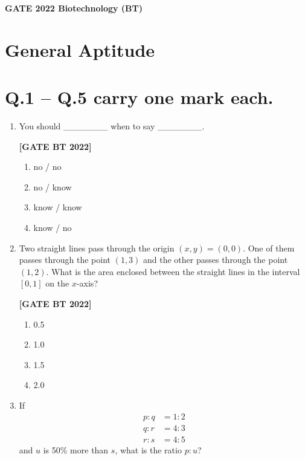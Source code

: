\documentclass[12pt]{article}
\begin{document}
\begin{center}
    \Large \textbf{GATE 2022 Biotechnology (BT)}
\end{center}

\section*{General Aptitude}

\section*{Q.1 -- Q.5 carry one mark each.}

\begin{enumerate}[leftmargin=2.5em, label=\textbf{Q.\arabic*}., itemsep=2em]

\item You should \_\_\_\_\_\_\_ when to say \_\_\_\_\_\_\_.

\noindent \textbf{[GATE BT 2022]}
\begin{multicols}{2}
\begin{enumerate}
    \item no / no
    \item no / know
    \item know / know
    \item know / no
\end{enumerate}
\end{multicols}

\item Two straight lines pass through the origin $(x,y) = (0,0)$. One of them passes through the point $(1,3)$ and the other passes through the point $(1,2)$.  
What is the area enclosed between the straight lines in the interval $[0,1]$ on the $x$-axis?

\noindent \textbf{[GATE BT 2022]}
\begin{multicols}{2}
\begin{enumerate}
    \item 0.5
    \item 1.0
    \item 1.5
    \item 2.0
\end{enumerate}
\end{multicols}

\item If
\begin{align*}
p:q &= 1:2 \\
q:r &= 4:3 \\
r:s &= 4:5
\end{align*}
and $u$ is 50\% more than $s$, what is the ratio $p:u$?


\end{enumerate}
\end{document}
